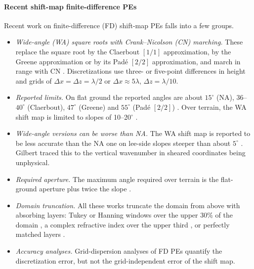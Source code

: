 \documentclass[journal]{IEEEtran}
\begin{document}
\paragraph*{Recent shift-map finite-difference PEs}
Recent work on finite-difference (FD) shift-map PEs falls into a few groups.
\begin{itemize}
\item \emph{Wide-angle (WA) square roots with Crank--Nicolson (CN) marching.}
These replace the square root by the Claerbout $[1/1]$ approximation, by the
Greene approximation or by its Pad\'e $[2/2]$ approximation, and march in range
with CN \cite{holm2007wasm,zhou2015greene,guo2017greene,guo2017pade,guo2023forestry,zhang2023ibcwasm,zhang2024wasm}.
Discretizations use three- or five-point differences in height and grids of
$\Delta x=\Delta z=\lambda/2$ or $\Delta x\approx5\lambda$, $\Delta z=\lambda/10$.
\item \emph{Reported limits.} On flat ground the reported angles are about
$15^\circ$ (NA), $36$--$40^\circ$ (Claerbout), $47^\circ$ (Greene) and $55^\circ$
(Pad\'e $[2/2]$) \cite{guo2017greene,guo2017pade,wangr2017dnlbc3d}. Over
terrain, the WA shift map is limited to slopes of 10--20$^\circ$
\cite{holm2007wasm,guo2017greene,zhang2023ibcwasm}.
\item \emph{Wide-angle versions can be worse than NA.} The WA shift map is
reported to be less accurate than the NA one on lee-side slopes steeper than
about $5^\circ$ \cite{wang2020smpe,zhou2017lfhighangle}. Gilbert
\cite{gilbert2022wabt} traced this to the vertical wavenumber in sheared
coordinates being unphysical.
\item \emph{Required aperture.} The maximum angle required over terrain is the
flat-ground aperture plus twice the slope \cite{zhangr2024maxangle}.
\item \emph{Domain truncation.} All these works truncate the domain from above
with absorbing layers: Tukey or Hanning windows over the upper 30\% of the
domain \cite{zhangp2014window,guo2023forestry}, a complex refractive index over
the upper third \cite{khodr2020iterative}, or perfectly matched layers
\cite{levy2001pml,ozbayat2011abc}.
\item \emph{Accuracy analyses.} Grid-dispersion analyses of FD PEs
\cite{zhang_sarris2015} quantify the discretization error, but not the
grid-independent error of the shift map.
\end{itemize}
\end{document}
